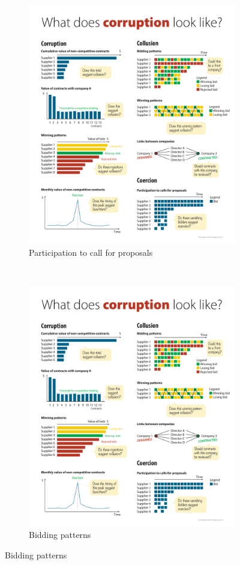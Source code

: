 \begin{figure}[H]
\ContinuedFloat

\begin{subfigure}[t]{0.5\textwidth}
\caption{Participation to call for proposals}
\label{fig_proposals}
\includegraphics[max width=1\textwidth]{../img/poster_coercion.pdf}
\end{subfigure}
~
\begin{subfigure}[t]{0.5\textwidth}
\caption{Bidding patterns}
\includegraphics[max width=1\textwidth]{../img/poster_win_pattern.pdf}

\end{subfigure}
\end{figure}
